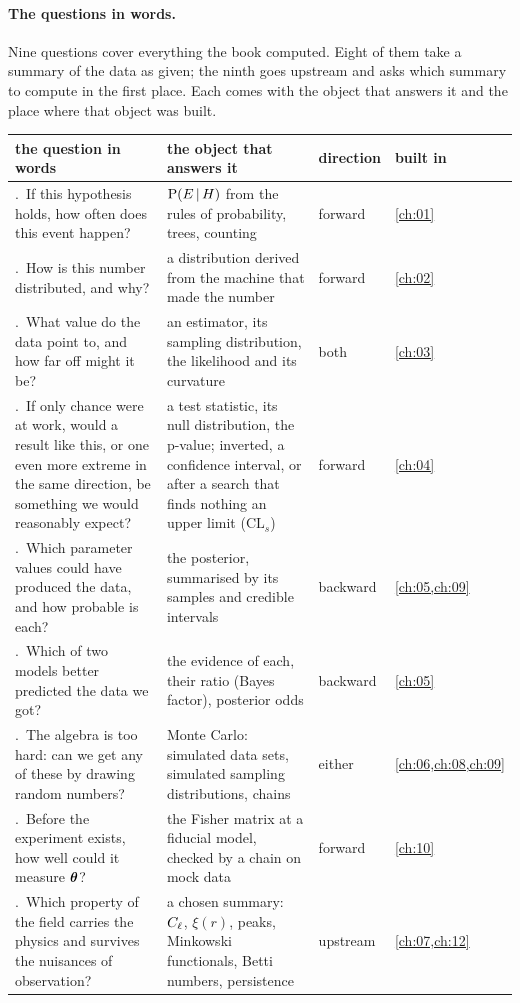 \paragraph{The questions in words.}
Nine questions cover everything the book computed. Eight of them take a summary of the
data as given; the ninth goes upstream and asks which summary to compute in the first
place. Each comes with the object that answers it and the place where that object was
built.

\begin{taxonomy}
\footnotesize
\renewcommand{\arraystretch}{1.3}
\begin{tabularx}{\linewidth}{@{}>{\raggedright\arraybackslash}p{4.0cm}
  >{\raggedright\arraybackslash}X >{\raggedright\arraybackslash}p{1.25cm}
  >{\raggedright\arraybackslash}p{1.7cm}@{}}
\toprule
\textbf{the question in words} & \textbf{the object that answers it} & \textbf{direction} & \textbf{built in}\\
\midrule
1.\ If this hypothesis holds, how often does this event happen? & $\operatorname{P}(E\,\vert\, H)$ from the rules of probability, trees, counting & forward & \cref{ch:01}\\
2.\ How is this number distributed, and why? & a distribution derived from the machine that made the number & forward & \cref{ch:02}\\
3.\ What value do the data point to, and how far off might it be? & an estimator, its sampling distribution, the likelihood and its curvature & both & \cref{ch:03}\\
4.\ If only chance were at work, would a result like this, or one even more extreme in the same direction, be something we would reasonably expect? & a test statistic, its null distribution, the p-value; inverted, a confidence interval, or after a search that finds nothing an upper limit ($\mathrm{CL}_s$) & forward & \cref{ch:04}\\
5.\ Which parameter values could have produced the data, and how probable is each? & the posterior, summarised by its samples and credible intervals & backward & \cref{ch:05,ch:09}\\
6.\ Which of two models better predicted the data we got? & the evidence of each, their ratio (Bayes factor), posterior odds & backward & \cref{ch:05}\\
7.\ The algebra is too hard: can we get any of these by drawing random numbers? & Monte Carlo: simulated data sets, simulated sampling distributions, chains & either & \cref{ch:06,ch:08,ch:09}\\
8.\ Before the experiment exists, how well could it measure $\bm{\theta}$? & the Fisher matrix at a fiducial model, checked by a chain on mock data & forward & \cref{ch:10}\\
9.\ Which property of the field carries the physics and survives the nuisances of observation? & a chosen summary: $C_\ell$, $\xi(r)$, peaks, Minkowski functionals, Betti numbers, persistence & upstream & \cref{ch:07,ch:12}\\
\bottomrule
\end{tabularx}
\end{taxonomy}


